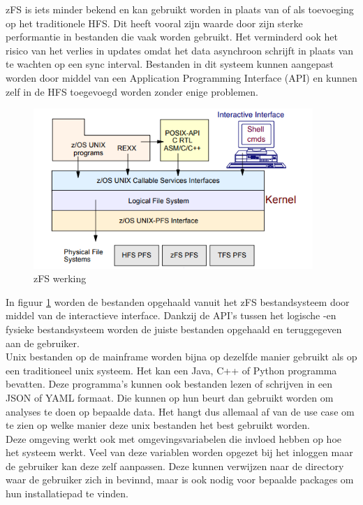 zFS is iets minder bekend en kan gebruikt worden in plaats van of als toevoeging op het traditionele HFS. Dit heeft vooral zijn waarde door zijn sterke performantie in bestanden die vaak worden gebruikt. Het verminderd ook het risico van het verlies in updates omdat het data asynchroon schrijft in plaats van te wachten op een sync interval. Bestanden in dit systeem kunnen aangepast worden door middel van een Application Programming Interface (API) en kunnen zelf in de HFS toegevoegd worden zonder enige problemen. \autocite{IBM2012} \\

\begin{figure}[pt!]
    \centering
    \includegraphics[width=300pt]{./graphics/zFS.png}
    \caption{zFS werking \autocite{IBM2012}}
    \label{fig:zFS}
\end{figure}

In figuur \ref{fig:zFS} worden de bestanden opgehaald vanuit het zFS bestandsysteem door middel van de interactieve interface. Dankzij de API's tussen het logische -en fysieke bestandsysteem worden de juiste bestanden opgehaald en teruggegeven aan de gebruiker. \\

Unix bestanden op de mainframe worden bijna op dezelfde manier gebruikt als op een traditioneel unix systeem. Het kan een Java, C++ of Python programma bevatten. Deze programma's kunnen ook bestanden lezen of schrijven in een JSON of YAML formaat. Die kunnen op hun beurt dan gebruikt worden om analyses te doen op bepaalde data. Het hangt dus allemaal af van de use case om te zien op welke manier deze unix bestanden het best gebruikt worden. \autocite{Precisely2020} \\

Deze omgeving werkt ook met omgevingsvariabelen die invloed hebben op hoe het systeem werkt. Veel van deze variablen worden opgezet bij het inloggen maar de gebruiker kan deze zelf aanpassen. Deze kunnen verwijzen naar de directory waar de gebruiker zich in bevinnd, maar is ook nodig voor bepaalde packages om hun installatiepad te vinden. \autocite{HenryStocker2017}

